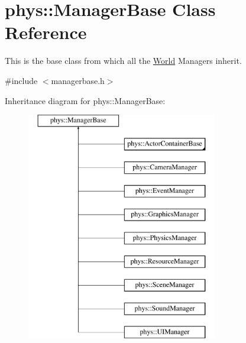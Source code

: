 \hypertarget{classphys_1_1ManagerBase}{
\section{phys::ManagerBase Class Reference}
\label{d2/de3/classphys_1_1ManagerBase}
}


This is the base class from which all the \hyperlink{classphys_1_1World}{World} Managers inherit.  




{\ttfamily \#include $<$managerbase.h$>$}

Inheritance diagram for phys::ManagerBase:\begin{figure}[H]
\begin{center}
\leavevmode
\includegraphics[height=10cm]{d2/de3/classphys_1_1ManagerBase}
\end{center}
\end{figure}

